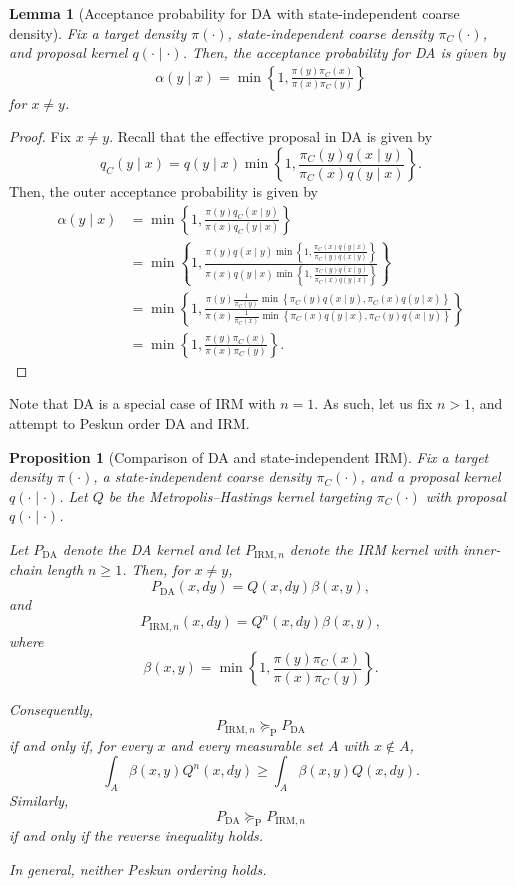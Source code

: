 \documentclass[12pt]{article}
\newtheorem{lemma}[theorem]{Lemma}
\newtheorem{proposition}[theorem]{Proposition}
\theoremstyle{definition}
\theoremstyle{remark}
\theoremstyle{plain}
\begin{document}
\begin{lemma}[Acceptance probability for DA with state-independent coarse density]
Fix a target density $\pi(\cdot)$, state-independent coarse density $\pi_{C}(\cdot)$, 
and proposal kernel $q(\cdot\mid\cdot)$.
Then, the acceptance probability for DA is given by
\begin{align*}
  \alpha(y\mid x) = \min\left\{1, \frac{\pi(y)\pi_C(x)}{\pi(x)\pi_C(y)}\right\}
\end{align*}
for $x \neq y$.
\end{lemma}
\begin{proof}
Fix $x \neq y$. 
Recall that the effective proposal in DA is given by 
\[
  q_C(y\mid x) = q(y\mid x)\min\left\{1, \frac{\pi_{C}(y)q(x\mid y)}{\pi_{C}(x)q(y\mid x)}\right\}.
\]
Then, the outer acceptance probability is given by
\begin{align*}
  \alpha(y\mid x) 
  &= \min\left\{1, \frac{\pi(y)q_C(x\mid y)}{\pi(x)q_C(y\mid x)}\right\} \\
  &= \min\left\{1, \frac{\pi(y)q(x\mid y)\min\left\{1, \frac{\pi_{C}(x)q(y\mid x)}{\pi_{C}(y)q(x\mid y)}\right\}}{\pi(x)q(y\mid x)\min\left\{1, \frac{\pi_{C}(y)q(x\mid y)}{\pi_{C}(x)q(y\mid x)}\right\}}\right\} \\
  &= \min\left\{1, \frac{\pi(y)\frac{1}{\pi_{C}(y)}\min\left\{\pi_{C}(y)q(x\mid y), \pi_{C}(x)q(y\mid x)\right\}}{\pi(x)\frac{1}{\pi_{C}(x)}\min\left\{\pi_{C}(x)q(y\mid x), \pi_{C}(y)q(x\mid y)\right\}}\right\} \\
  &= \min\left\{1, \frac{\pi(y)\pi_C(x)}{\pi(x)\pi_C(y)}\right\}.
\end{align*}
\end{proof}

Note that DA is a special case of IRM with $n=1$. 
As such, let us fix $n>1$, and attempt to Peskun order DA and IRM. 

\begin{proposition}[Comparison of DA and state-independent IRM]
Fix a target density $\pi(\cdot)$, a state-independent coarse density $\pi_C(\cdot)$,
and a proposal kernel $q(\cdot\mid\cdot)$. Let $Q$ be the Metropolis--Hastings kernel
targeting $\pi_C(\cdot)$ with proposal $q(\cdot\mid\cdot)$.

Let $P_{\mathrm{DA}}$ denote the DA kernel and let
$P_{\mathrm{IRM},n}$ denote the IRM kernel with inner-chain length
$n\geq 1$. Then, for $x\neq y$,
\[
P_{\mathrm{DA}}(x,dy)
=
Q(x,dy)\beta(x,y),
\]
and
\[
P_{\mathrm{IRM},n}(x,dy)
=
Q^n(x,dy)\beta(x,y),
\]
where
\[
\beta(x,y)
=
\min\left\{
1,
\frac{\pi(y)\pi_C(x)}
      {\pi(x)\pi_C(y)}
\right\}.
\]

Consequently,
\[
P_{\mathrm{IRM},n}\succeq_{\mathrm P}P_{\mathrm{DA}}
\]
if and only if, for every $x$ and every measurable set $A$ with
$x\notin A$,
\[
\int_A \beta(x,y)Q^n(x,dy)
\geq
\int_A \beta(x,y)Q(x,dy).
\]
Similarly,
\[
P_{\mathrm{DA}}\succeq_{\mathrm P}P_{\mathrm{IRM},n}
\]
if and only if the reverse inequality holds.

In general, neither Peskun ordering holds.
\end{proposition}
\end{document}
